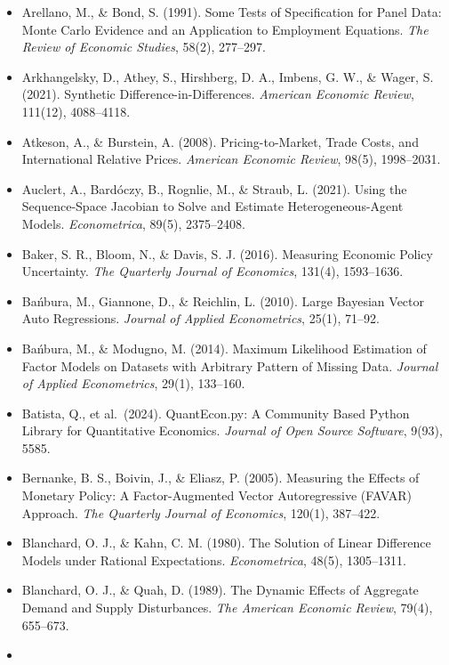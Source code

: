 \documentclass[11pt,letterpaper]{article}
\newcounter{none} %
\renewcommand{\_}{\pmunderscore\allowbreak}
\begin{document}
\begin{itemize}
  Antolín-Díaz, J., \& Rubio-Ramírez, J. F. (2018). Narrative Sign Restrictions for SVARs. \emph{American Economic Review}, 108(10), 2802--2829.
\item
  Arellano, M., \& Bond, S. (1991). Some Tests of Specification for Panel Data: Monte Carlo Evidence and an Application to Employment Equations. \emph{The Review of Economic Studies}, 58(2), 277--297.
\item
  Arkhangelsky, D., Athey, S., Hirshberg, D. A., Imbens, G. W., \& Wager, S. (2021). Synthetic Difference-in-Differences. \emph{American Economic Review}, 111(12), 4088--4118.
\item
  Atkeson, A., \& Burstein, A. (2008). Pricing-to-Market, Trade Costs, and International Relative Prices. \emph{American Economic Review}, 98(5), 1998--2031.
\item
  Auclert, A., Bardóczy, B., Rognlie, M., \& Straub, L. (2021). Using the Sequence-Space Jacobian to Solve and Estimate Heterogeneous-Agent Models. \emph{Econometrica}, 89(5), 2375--2408.
\item
  Baker, S. R., Bloom, N., \& Davis, S. J. (2016). Measuring Economic Policy Uncertainty. \emph{The Quarterly Journal of Economics}, 131(4), 1593--1636.
\item
  Bańbura, M., Giannone, D., \& Reichlin, L. (2010). Large Bayesian Vector Auto Regressions. \emph{Journal of Applied Econometrics}, 25(1), 71--92.
\item
  Bańbura, M., \& Modugno, M. (2014). Maximum Likelihood Estimation of Factor Models on Datasets with Arbitrary Pattern of Missing Data. \emph{Journal of Applied Econometrics}, 29(1), 133--160.
\item
  Batista, Q., et al.~(2024). QuantEcon.py: A Community Based Python Library for Quantitative Economics. \emph{Journal of Open Source Software}, 9(93), 5585.
\item
  Bernanke, B. S., Boivin, J., \& Eliasz, P. (2005). Measuring the Effects of Monetary Policy: A Factor-Augmented Vector Autoregressive (FAVAR) Approach. \emph{The Quarterly Journal of Economics}, 120(1), 387--422.
\item
  Blanchard, O. J., \& Kahn, C. M. (1980). The Solution of Linear Difference Models under Rational Expectations. \emph{Econometrica}, 48(5), 1305--1311.
\item
  Blanchard, O. J., \& Quah, D. (1989). The Dynamic Effects of Aggregate Demand and Supply Disturbances. \emph{The American Economic Review}, 79(4), 655--673.
\item

\end{itemize}
\end{document}
